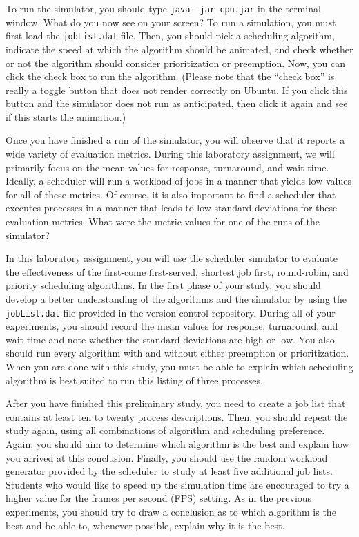   To run the simulator, you should type {\tt java -jar cpu.jar} in the terminal window.  What do you now see on your
  screen? To run a simulation, you must first load the {\tt jobList.dat} file.  Then, you should pick a scheduling
  algorithm, indicate the speed at which the algorithm should be animated, and check whether or not the algorithm should
  consider prioritization or preemption. Now, you can click the check box to run the algorithm. (Please note that the
  ``check box'' is really a toggle button that does not render correctly on Ubuntu. If you click this button and the
  simulator does not run as anticipated, then click it again and see if this starts the animation.)

  Once you have finished a run of the simulator, you will observe that it reports a wide variety of evaluation metrics.
  During this laboratory assignment, we will primarily focus on the mean values for response, turnaround, and wait time.
  Ideally, a scheduler will run a workload of jobs in a manner that yields low values for all of these metrics. Of
  course, it is also important to find a scheduler that executes processes in a manner that leads to low standard
  deviations for these evaluation metrics. What were the metric values for one of the runs of the simulator?

  In this laboratory assignment, you will use the scheduler simulator to evaluate the effectiveness of the first-come
  first-served, shortest job first, round-robin, and priority scheduling algorithms.  In the first phase of your study,
  you should develop a better understanding of the algorithms and the simulator by using the {\tt jobList.dat} file
  provided in the version control repository. During all of your experiments, you should record the mean values for
  response, turnaround, and wait time and note whether the standard deviations are high or low. You also should run
  every algorithm with and without either preemption or prioritization. When you are done with this study, you must be
  able to explain which scheduling algorithm is best suited to run this listing of three processes. 

  After you have finished this preliminary study, you need to create a job list that contains at least ten to twenty
  process descriptions.  Then, you should repeat the study again, using all combinations of algorithm and scheduling 
  preference.  Again, you should aim to determine which algorithm is the best and explain how you arrived at this
  conclusion. Finally, you should use the random workload generator provided by the scheduler to study at least five
  additional job lists. Students who would like to speed up the simulation time are encouraged to try a higher value for
  the frames per second (FPS) setting. As in the previous experiments, you should try to draw a conclusion as to which
  algorithm is the best and be able to, whenever possible, explain why it is the best.

